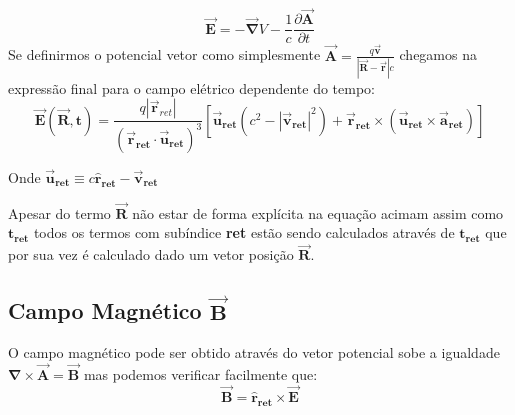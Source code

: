 \documentclass{article}
\begin{document}
\begin{equation}
    \vec{\mathbf{E}} = -\vec{\mathbf{\nabla}}V - \frac{1}{c}\frac{\partial \vec{\mathbf{A}}}{\partial t}
\end{equation}
\hspace{0.45cm}Se definirmos o potencial vetor como simplesmente $\vec{\mathbf{A}} = \frac{q \vec{\mathbf{v}}}{|\vec{\mathbf{R}} - \vec{\mathbf{r}}|c}$ chegamos na expressão final para o campo elétrico dependente do tempo:
\begin{equation}
    \vec{\mathbf{E}}(\vec{\mathbf{R}}, \mathbf{t}) = \frac{q|\vec{\mathbf{r}}_{ret}|}{(\vec{\mathbf{r}}_\mathbf{ret} \cdot \vec{\mathbf{u}}_\mathbf{ret})^3}[\vec{\mathbf{u}}_\mathbf{ret}(c^2 - |\vec{\mathbf{v}}_\mathbf{ret}|^2) + \vec{\mathbf{r}}_\mathbf{ret} \times (\vec{\mathbf{u}}_\mathbf{ret} \times \vec{\mathbf{a}}_\mathbf{ret})]
\end{equation}
\begin{center}
    Onde $\vec{\mathbf{u}}_\mathbf{ret} \equiv c\hat{\mathbf{r}}_\mathbf{ret} - \vec{\mathbf{v}}_\mathbf{ret}$
\end{center}
Apesar do termo $\vec{\mathbf{R}}$ não estar de forma explícita na equação acimam assim como $\mathbf{t_{ret}}$ todos os termos com subíndice \textbf{ret} estão sendo calculados através de $\mathbf{t_{ret}}$ que por sua vez é calculado dado um vetor posição $\vec{\mathbf{R}}$.
\subsection{Campo Magnético $\vec{\mathbf{B}}$}
\hspace{0.45cm}O campo magnético pode ser obtido através do vetor potencial sobe a igualdade $\mathbf{\nabla} \times \vec{\mathbf{A}} = \vec{\mathbf{B}}$ mas podemos verificar facilmente que:
\begin{equation}
    \vec{\mathbf{B}} = \hat{\mathbf{r}}_\mathbf{ret} \times \vec{\mathbf{E}}
\end{equation}
\newpage
\vspace{-1cm}
\end{document}
